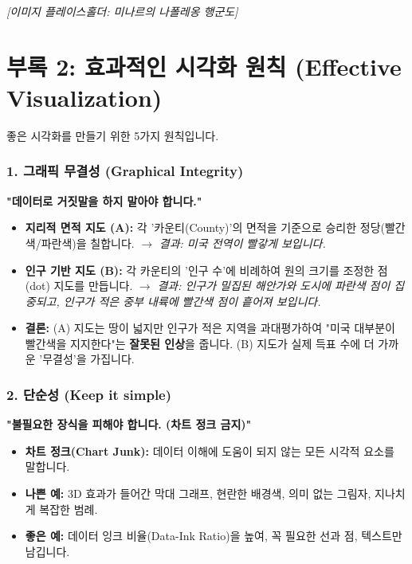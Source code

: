 \documentclass[11pt,a4paper]{book}
\theoremstyle{definition}
\begin{document}
\begin{center}
    \textit{[이미지 플레이스홀더: 미나르의 나폴레옹 행군도]}
\end{center}


\section{부록 2: 효과적인 시각화 원칙 (Effective Visualization)}

좋은 시각화를 만들기 위한 5가지 원칙입니다.

\subsubsection{1. 그래픽 무결성 (Graphical Integrity)}

\textbf{"데이터로 거짓말을 하지 말아야 합니다."}

\begin{examplebox}[title={잘못된 예: 2020년 미국 대선 지도}]
\begin{itemize}
    \item \textbf{지리적 면적 지도 (A):} 각 '카운티(County)'의 면적을 기준으로 승리한 정당(빨간색/파란색)을 칠합니다. $\rightarrow$ \textit{결과: 미국 전역이 빨갛게 보입니다.}
    \item \textbf{인구 기반 지도 (B):} 각 카운티의 '인구 수'에 비례하여 원의 크기를 조정한 점(dot) 지도를 만듭니다. $\rightarrow$ \textit{결과: 인구가 밀집된 해안가와 도시에 파란색 점이 집중되고, 인구가 적은 중부 내륙에 빨간색 점이 흩어져 보입니다.}
    \item \textbf{결론:} (A) 지도는 땅이 넓지만 인구가 적은 지역을 과대평가하여 "미국 대부분이 빨간색을 지지한다"는 \textbf{잘못된 인상}을 줍니다. (B) 지도가 실제 득표 수에 더 가까운 '무결성'을 가집니다.
\end{itemize}
\end{examplebox}

\subsubsection{2. 단순성 (Keep it simple)}

\textbf{"불필요한 장식을 피해야 합니다. (차트 정크 금지)"}

\begin{itemize}
    \item \textbf{차트 정크(Chart Junk):} 데이터 이해에 도움이 되지 않는 모든 시각적 요소를 말합니다.
    \item \textbf{나쁜 예:} 3D 효과가 들어간 막대 그래프, 현란한 배경색, 의미 없는 그림자, 지나치게 복잡한 범례.
    \item \textbf{좋은 예:} 데이터 잉크 비율(Data-Ink Ratio)을 높여, 꼭 필요한 선과 점, 텍스트만 남깁니다.
\end{itemize}
\end{document}
